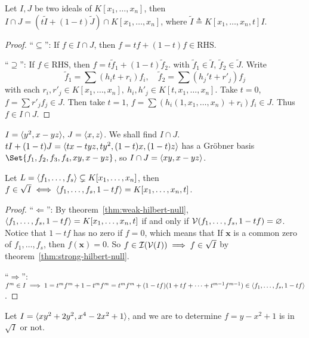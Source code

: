 \begin{theorem}
  Let $I, J$ be two ideals of $K[x_1, \dots, x_n]$, then $I \cap J =
  (t \tilde{I} + (1 - t) \tilde{J}) \cap K[x_1, \dots, x_n]$,
  where $\tilde{I} \triangleq K[x_1, \dots, x_n, t] I$.
  \begin{proof}
    ``$\subseteq$'': If $f \in I \cap J$, then $f = tf + (1-t)f \in \text{RHS}$.

    ``$\supseteq$'': If $f \in \text{RHS}$, then $f = t \tilde{f}_1 + (1-t) \tilde{f}_2$.
    with $\tilde{f}_1 \in \tilde{I}$, $\tilde{f}_2 \in \tilde{J}$.
    Write
    \[ \tilde{f}_1 = \sum (h_i t + r_i) f_i, \quad
      \tilde{f}_2 = \sum (h_j' t + r'_j) f_j \]
    with each $r_i, r'_j \in K[x_1, \dots, x_n], \ h_i, h'_j \in K[t, x_1, \dots, x_n] $.
    Take $t = 0$, $f = \sum r'_j f_j \in J$. Then take $t = 1$,
    $f = \sum (h_i(1, x_1, \dots, x_n) + r_i) f_i \in J$. Thus $f \in I \cap J$.
  \end{proof}
\end{theorem}

\begin{example}
  $I = \langle y^2 , x - yz \rangle, \, J = \langle x, z \rangle$. We shall find $I \cap J$. \\
  $tI + (1-t)J = \langle tx - tyz, ty^2, (1-t)x, (1-t)z \rangle$ has a Gr\"obner basis
  $\Set{f_1, f_2, f_3, f_4, xy, x - yz}$, so $I \cap J = \langle xy, x-yz \rangle$.
\end{example}

\begin{theorem}
  Let $L = \langle f_1, \dots, f_s \rangle \subsetneq K[x_1, \dots, x_n]$, then
  $f \in \sqrt{I} \iff \langle f_1, \dots, f_s, 1 - tf \rangle = K[x_1, \dots, x_n, t]$.
  \begin{proof}
    ``$\Leftarrow$'': By theorem~\ref{thm:weak-hilbert-null},
    $\langle f_1, \dots, f_s, 1-tf\rangle = K[x_1, \dots, x_n, t]$ if and only if
    $\mathcal{V}(f_1, \dots, f_s, 1-tf) = \varnothing$. Notice that $1-tf$
    has no zero if $f = 0$, which means that
    If $\bm{x}$ is a common zero of $f_1, \dots, f_s$, then
    $f(\bm{x}) = 0$. So $f \in \mathcal{I}(\mathcal{V}(I)) \implies f \in \sqrt{I}$
    by theorem~\ref{thm:strong-hilbert-null}.

    ``$\Rightarrow$'': $f^m \in I \implies 1 = t^mf^m + 1 - t^m f^m
    = t^m f^m + (1-tf)(1 + tf + \dots + t^{m-1} f^{m-1}) \in \langle f_1, \dots, f_s, 1-tf\rangle$.
  \end{proof}
\end{theorem}

\begin{example}
  Let $I = \langle xy^2 + 2y^2, x^4 - 2x^2 + 1 \rangle$, and we are to determine
  $f = y - x^2 + 1$ is in $\sqrt{I}$ or not.
\end{example}

